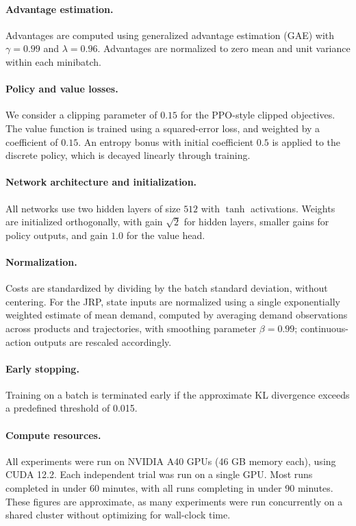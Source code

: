 \documentclass{article}
\theoremstyle{definition}
\theoremstyle{remark}
\begin{document}
\paragraph{Advantage estimation.}
Advantages are computed using generalized advantage estimation (GAE) \cite{schulman2015high} with $\gamma = 0.99$ and $\lambda = 0.96$. 
Advantages are normalized to zero mean and unit variance within each minibatch. 

\paragraph{Policy and value losses.}
We consider a clipping parameter of $0.15$ for the PPO-style clipped objectives. 
The value function is trained using a squared-error loss, and weighted by a coefficient of $0.15$. 
An entropy bonus with initial coefficient $0.5$ is applied to the discrete policy, which is decayed linearly through training.


\paragraph{Network architecture and initialization.}
All networks use two hidden layers of size $512$ with $\tanh$ activations. 
Weights are initialized orthogonally, with gain $\sqrt{2}$ for hidden layers, smaller gains for policy outputs, and gain $1.0$ for the value head. 

\paragraph{Normalization.}
Costs are standardized by dividing by the batch standard deviation, without centering.
For the JRP, state inputs are normalized using a single exponentially weighted estimate of mean demand, computed by averaging demand observations across products and trajectories, with smoothing parameter $\beta=0.99$; continuous-action outputs are rescaled accordingly.

\paragraph{Early stopping.}
Training on a batch is terminated early if the approximate KL divergence exceeds a predefined threshold of 0.015.


\paragraph{Compute resources.}
All experiments were run on NVIDIA A40 GPUs (46 GB memory each), using CUDA 12.2.
Each independent trial was run on a single GPU. Most runs completed in under 60
minutes, with all runs completing in under 90 minutes. These figures are approximate,
as many experiments were run concurrently on a shared cluster without optimizing for
wall-clock time.
\end{document}
